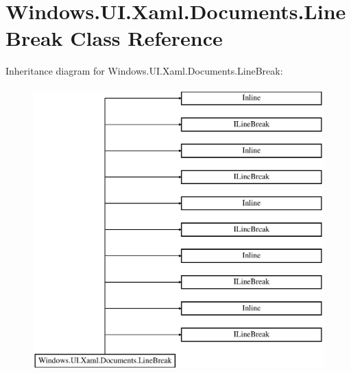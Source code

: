 \hypertarget{class_windows_1_1_u_i_1_1_xaml_1_1_documents_1_1_line_break}{}\section{Windows.\+U\+I.\+Xaml.\+Documents.\+Line\+Break Class Reference}
\label{class_windows_1_1_u_i_1_1_xaml_1_1_documents_1_1_line_break}
Inheritance diagram for Windows.\+U\+I.\+Xaml.\+Documents.\+Line\+Break\+:\begin{figure}[H]
\begin{center}
\leavevmode
\includegraphics[height=11.000000cm]{class_windows_1_1_u_i_1_1_xaml_1_1_documents_1_1_line_break}
\end{center}
\end{figure}

